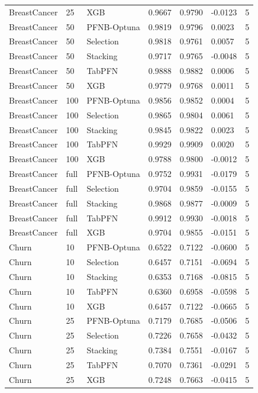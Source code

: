 \begin{tabular}{llllllr}
BreastCancer & 25 & XGB & 0.9667 & 0.9790 & -0.0123 & 5 \\
BreastCancer & 50 & PFNB-Optuna & 0.9819 & 0.9796 & 0.0023 & 5 \\
BreastCancer & 50 & Selection & 0.9818 & 0.9761 & 0.0057 & 5 \\
BreastCancer & 50 & Stacking & 0.9717 & 0.9765 & -0.0048 & 5 \\
BreastCancer & 50 & TabPFN & 0.9888 & 0.9882 & 0.0006 & 5 \\
BreastCancer & 50 & XGB & 0.9779 & 0.9768 & 0.0011 & 5 \\
BreastCancer & 100 & PFNB-Optuna & 0.9856 & 0.9852 & 0.0004 & 5 \\
BreastCancer & 100 & Selection & 0.9865 & 0.9804 & 0.0061 & 5 \\
BreastCancer & 100 & Stacking & 0.9845 & 0.9822 & 0.0023 & 5 \\
BreastCancer & 100 & TabPFN & 0.9929 & 0.9909 & 0.0020 & 5 \\
BreastCancer & 100 & XGB & 0.9788 & 0.9800 & -0.0012 & 5 \\
BreastCancer & full & PFNB-Optuna & 0.9752 & 0.9931 & -0.0179 & 5 \\
BreastCancer & full & Selection & 0.9704 & 0.9859 & -0.0155 & 5 \\
BreastCancer & full & Stacking & 0.9868 & 0.9877 & -0.0009 & 5 \\
BreastCancer & full & TabPFN & 0.9912 & 0.9930 & -0.0018 & 5 \\
BreastCancer & full & XGB & 0.9704 & 0.9855 & -0.0151 & 5 \\
Churn & 10 & PFNB-Optuna & 0.6522 & 0.7122 & -0.0600 & 5 \\
Churn & 10 & Selection & 0.6457 & 0.7151 & -0.0694 & 5 \\
Churn & 10 & Stacking & 0.6353 & 0.7168 & -0.0815 & 5 \\
Churn & 10 & TabPFN & 0.6360 & 0.6958 & -0.0598 & 5 \\
Churn & 10 & XGB & 0.6457 & 0.7122 & -0.0665 & 5 \\
Churn & 25 & PFNB-Optuna & 0.7179 & 0.7685 & -0.0506 & 5 \\
Churn & 25 & Selection & 0.7226 & 0.7658 & -0.0432 & 5 \\
Churn & 25 & Stacking & 0.7384 & 0.7551 & -0.0167 & 5 \\
Churn & 25 & TabPFN & 0.7070 & 0.7361 & -0.0291 & 5 \\
Churn & 25 & XGB & 0.7248 & 0.7663 & -0.0415 & 5 \\

\end{tabular}
